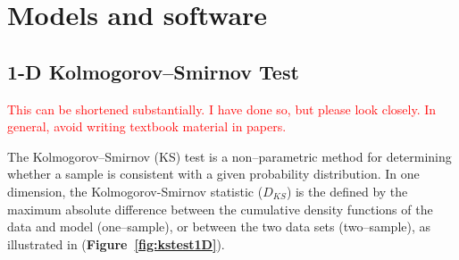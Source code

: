\documentclass[codesnippet]{jss}
\newcommand{\RBnote}[1]{\textcolor{red}{#1}}
\begin{document}


\section{Models and software} \label{sec:models}

\subsection{1-D Kolmogorov--Smirnov Test}

\RBnote{This can be shortened substantially.  I have done so, but please look closely.  In general, avoid writing textbook material in papers.}

The Kolmogorov--Smirnov (KS) test is a non--parametric method for determining whether a sample is consistent with a given probability distribution. %
%
%
%
%
In one dimension,
the Kolmogorov-Smirnov statistic ($D_{KS}$) is the defined by the maximum absolute difference between the cumulative density functions of the data and model (one--sample), or between the two data sets (two--sample),
as illustrated in (\textbf{Figure~\ref{fig:kstest1D}}).
\end{document}
